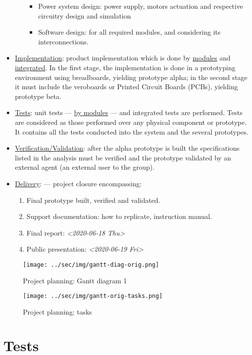 \documentclass[11pt]{article}
\begin{document}
\begin{itemize}
\begin{itemize}
\begin{itemize}
\item Power system design: power supply, motors actuation and respective
circuitry design and simulation
\item Software design: for all required modules, and considering its
interconnections.
\end{itemize}
\end{itemize}
\item \uline{Implementation}: product implementation which is done by \uline{modules} and
\uline{integrated}. In the first stage, the implementation is done in a prototyping
environment using breadboards, yielding prototype alpha; in the second stage
it must include the veroboards or Printed Circuit Boards (PCBs), yielding
prototype beta.
\item \uline{Tests}: unit tests --- \uline{by modules} --- and integrated tests are
performed. Tests are considered as those performed over any physical
component or prototype. It contains all the tests conducted into the system
and the several prototypes.
\item \uline{Verification/Validation}: after the alpha prototype is built the
specifications listed in the analysis must be verified and the prototype
validated by an external agent (an external user to the group).
\item \uline{Delivery}: --- project closure encompassing:
\begin{enumerate}
\item Final prototype built, verified and validated.
\item Support documentation: how to replicate, instruction manual.
\item Final report: \textit{<2020-06-18 Thu>}
\item Public presentation: \textit{<2020-06-19 Fri> }
\end{enumerate}
\end{itemize}

\begin{figure}[htbp]
\centering
\texttt{[image: ../sec/img/gantt-diag-orig.png]}
\caption{\label{fig:gantt-diag2}Project planning: Gantt diagram 1}
\end{figure}
\begin{figure}[htbp]
\centering
\texttt{[image: ../sec/img/gantt-orig-tasks.png]}
\caption{\label{fig:gantt-tasks}Project planning: tasks}
\end{figure}

\section{Tests}
\label{sec:orga3bd3ad}
\end{document}
